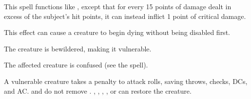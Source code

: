 \begin{spelleffect}
  This spell functions like , except that for every 15 points of damage dealt in excess of the subject's hit points, it can instead inflict 1 point of critical damage.
\end{spelleffect}
\begin{spellnotes}
  This effect can cause a creature to begin dying without being disabled first.
\end{spellnotes}

\begin{spellhealthy}
  The creature is bewildered, making it vulnerable.
\end{spellhealthy}
\begin{spellblood}
  \par The affected creature is confused (see the  spell).
\end{spellblood}
\begin{spellnotes}
  A vulnerable creature takes a  penalty to attack rolls, saving throws, checks, DCs, and AC.  and  do not remove . , , , , or  can restore the creature.
\end{spellnotes}

